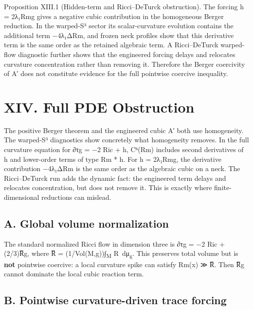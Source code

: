 \documentclass[
]{article}
\begin{document}
Proposition XIII.1 (Hidden-term and Ricci--DeTurck obstruction). The forcing h = 2λ₁\textbar Rm\textbar g gives a negative cubic contribution in the homogeneous Berger reduction. In the warped-S³ sector its scalar-curvature evolution contains the additional term −4λ₁Δ\textbar Rm\textbar, and frozen neck profiles show that this derivative term is the same order as the retained algebraic term. A Ricci--DeTurck warped-flow diagnostic further shows that the engineered forcing delays and relocates curvature concentration rather than removing it. Therefore the Berger coercivity of A′ does not constitute evidence for the full pointwise coercive inequality.

\section{XIV. Full PDE Obstruction}\label{xiv.-full-pde-obstruction}

The positive Berger theorem and the engineered cubic A′ both use homogeneity. The warped-S³ diagnostics show concretely what homogeneity removes. In the full curvature equation for ∂τg = −2 Ric + h, Cʰ(Rm) includes second derivatives of h and lower-order terms of type Rm * h. For h = 2λ₁\textbar Rm\textbar g, the derivative contribution −4λ₁Δ\textbar Rm\textbar{} is the same order as the algebraic cubic on a neck. The Ricci--DeTurck run adds the dynamic fact: the engineered term delays and relocates concentration, but does not remove it. This is exactly where finite-dimensional reductions can mislead.

\subsection{A. Global volume normalization}\label{a.-global-volume-normalization}

The standard normalized Ricci flow in dimension three is ∂τg = −2 Ric + (2/3)R̅g, where R̅ = (1/Vol(M,g))∫\textsubscript{M} R~dμ\textsubscript{g}. This preserves total volume but is \textbf{not} pointwise coercive: a local curvature spike can satisfy \textbar Rm\textbar(x) ≫ \textbar R̅\textbar. Then R̅g cannot dominate the local cubic reaction term.

\subsection{B. Pointwise curvature-driven trace forcing}\label{b.-pointwise-curvature-driven-trace-forcing}
\end{document}
